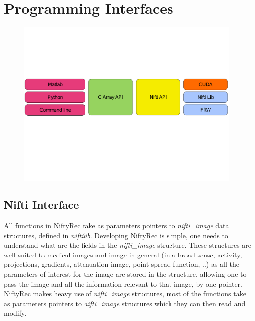 \documentclass[12pt,a4paper]{report}
\begin{document}


\section{Programming Interfaces}

  \begin{figure}[htbp]
    \label{fig:api}
    \begin{center}
      \includegraphics[width=4.3in]{api}
    \end{center}
  \end{figure}

\subsection{Nifti Interface}
All functions in NiftyRec take as parameters pointers to \emph{nifti\_image} data structures, defined in \emph{niftilib}. 
Developing NiftyRec is simple, one needs to understand what are the fields in the \emph{nifti\_image} structure. 
These structures are well suited to medical images and image in general (in a broad sense, activity, projections, gradients, 
attenuation image, point spread function, ..) as all the parameters of interest for the image are 
stored in the structure, allowing one to pass the image and all the information relevant to that image, by one pointer. 
NiftyRec makes heavy use of \emph{nifti\_image} structures, most of the functions take as parameters pointers to \emph{nifti\_image} 
structures which they can then read and modify. 
\end{document}

